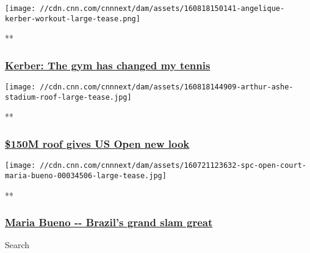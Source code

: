 \href{/videos/sports/2016/08/18/spc-open-court-angelique-kerber-workout.cnn}{}

\texttt{[image: //cdn.cnn.com/cnnnext/dam/assets/160818150141-angelique-kerber-workout-large-tease.png]}

**

\hypertarget{kerber-the-gym-has-changed-my-tennis}{%
\subsubsection{\texorpdfstring{\href{/videos/sports/2016/08/18/spc-open-court-angelique-kerber-workout.cnn}{Kerber:
The gym has changed my
tennis}}{Kerber: The gym has changed my tennis}}\label{kerber-the-gym-has-changed-my-tennis}}

\href{/videos/sports/2016/08/18/spc-open-court-us-open-new-roof-numbers.cnn}{}

\texttt{[image: //cdn.cnn.com/cnnnext/dam/assets/160818144909-arthur-ashe-stadium-roof-large-tease.jpg]}

**

\hypertarget{150m-roof-gives-us-open-new-look}{%
\subsubsection{\texorpdfstring{\href{/videos/sports/2016/08/18/spc-open-court-us-open-new-roof-numbers.cnn}{\$150M
roof gives US Open new
look}}{\$150M roof gives US Open new look}}\label{150m-roof-gives-us-open-new-look}}

\href{/videos/sports/2016/07/20/spc-open-court-maria-bueno.cnn}{}

\texttt{[image: //cdn.cnn.com/cnnnext/dam/assets/160721123632-spc-open-court-maria-bueno-00034506-large-tease.jpg]}

**

\hypertarget{maria-bueno----brazils-grand-slam-great-}{%
\subsubsection{\texorpdfstring{\href{/videos/sports/2016/07/20/spc-open-court-maria-bueno.cnn}{Maria
Bueno -\/- Brazil's grand slam great
}}{Maria Bueno -\/- Brazil's grand slam great }}\label{maria-bueno----brazils-grand-slam-great-}}

Search

